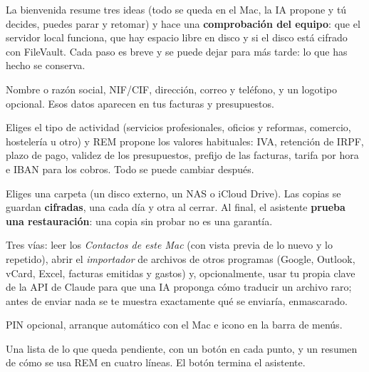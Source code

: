 La bienvenida resume tres ideas (todo se queda en el Mac, la IA propone y tú decides, puedes parar y retomar) y hace una \textbf{comprobación del equipo}: que el servidor local funciona, que hay espacio libre en disco y si el disco está cifrado con FileVault. Cada paso es breve y se puede dejar para más tarde: lo que has hecho se conserva.

\begin{description}[leftmargin=0.6cm,style=nextline]
\item[Tu negocio.] Nombre o razón social, NIF/CIF, dirección, correo y teléfono, y un logotipo opcional. Esos datos aparecen en tus facturas y presupuestos.
\item[Cómo facturas.] Eliges el tipo de actividad (servicios profesionales, oficios y reformas, comercio, hostelería u otro) y REM propone los valores habituales: IVA, retención de IRPF, plazo de pago, validez de los presupuestos, prefijo de las facturas, tarifa por hora e IBAN para los cobros. Todo se puede cambiar después.
\end{description}

\begin{description}[leftmargin=0.6cm,style=nextline]
\item[Copias de seguridad.] Eliges una carpeta (un disco externo, un NAS o iCloud Drive). Las copias se guardan \textbf{cifradas}, una cada día y otra al cerrar. Al final, el asistente \textbf{prueba una restauración}: una copia sin probar no es una garantía.
\item[Traer tus datos.] Tres vías: leer los \emph{Contactos de este Mac} (con vista previa de lo nuevo y lo repetido), abrir el \emph{importador} de archivos de otros programas (Google, Outlook, vCard, Excel, facturas emitidas y gastos) y, opcionalmente, usar tu propia clave de la API de Claude para que una IA proponga cómo traducir un archivo raro; antes de enviar nada se te muestra exactamente qué se enviaría, enmascarado.
\end{description}

\begin{description}[leftmargin=0.6cm,style=nextline]
\item[Acceso y arranque.] PIN opcional, arranque automático con el Mac e icono en la barra de menús.
\item[Todo listo.] Una lista de lo que queda pendiente, con un botón  en cada punto, y un resumen de cómo se usa REM en cuatro líneas. El botón  termina el asistente.
\end{description}


